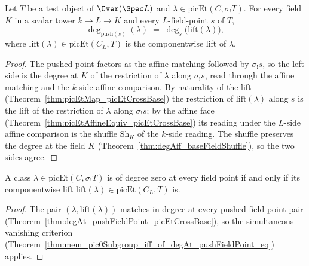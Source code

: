 \begin{theorem}
  \label{thm:degAt_pushFieldPoint_picEtCrossBase}
  \leanok
  Let \(T\) be a test object of \(\Over(\Spec L)\) and
  \(\lambda \in \mathrm{picEt}(C, \sigma_{!}T)\).  For every field \(K\) in a scalar
  tower \(k \to L \to K\) and every \(L\)-field-point \(s\) of \(T\),
  \[
    \deg_{\mathrm{push}(s)}(\lambda)
      \;=\; \deg_{s}\bigl(\mathrm{lift}(\lambda)\bigr),
  \]
  where \(\mathrm{lift}(\lambda) \in \mathrm{picEt}(C_L, T)\) is the componentwise
  lift of \(\lambda\).
\end{theorem}
\begin{proof}
  \leanok
  The pushed point factors as the affine matching followed by \(\sigma_{!}s\), so the
  left side is the degree at \(K\) of the restriction of \(\lambda\) along
  \(\sigma_{!}s\), read through the affine matching and the \(k\)-side affine
  comparison.  By naturality of the lift
  (Theorem~\ref{thm:picEtMap_picEtCrossBase}) the restriction of
  \(\mathrm{lift}(\lambda)\) along \(s\) is the lift of the restriction of \(\lambda\)
  along \(\sigma_{!}s\); by the affine face
  (Theorem~\ref{thm:picEtAffineEquiv_picEtCrossBase}) its reading under the
  \(L\)-side affine comparison is the shuffle \(\mathrm{Sh}_K\) of the \(k\)-side
  reading.  The shuffle preserves the degree at the field \(K\)
  (Theorem~\ref{thm:degAff_baseFieldShuffle}), so the two sides agree.
\end{proof}

\begin{theorem}
  \label{thm:mem_pic0Subgroup_picEtCrossBase_iff}
  \leanok
  A class \(\lambda \in \mathrm{picEt}(C, \sigma_{!}T)\) is of degree zero at every
  field point if and only if its componentwise lift
  \(\mathrm{lift}(\lambda) \in \mathrm{picEt}(C_L, T)\) is.
\end{theorem}
\begin{proof}
  \leanok
  The pair \((\lambda, \mathrm{lift}(\lambda))\) matches in degree at every pushed
  field-point pair (Theorem~\ref{thm:degAt_pushFieldPoint_picEtCrossBase}), so the
  simultaneous-vanishing criterion
  (Theorem~\ref{thm:mem_pic0Subgroup_iff_of_degAt_pushFieldPoint_eq}) applies.
\end{proof}

